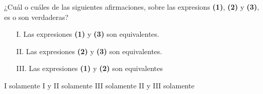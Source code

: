 \documentclass[10pt,letterpaper,addpoints]{exam}
\begin{document}
\begin{questions}
\begin{multicols}{2}
\begin{oneparchoices}
\end{oneparchoices}
  \question \label{q3} ¿Cuál o cuáles de las siguientes afirmaciones, sobre las expresions \textbf{(1)}, \textbf{(2)} y \textbf{(3)}, es o son verdaderas?
    \begin{itemize}
      \item[I.] Las expresiones \textbf{(1)} y \textbf{(3)} son equivalentes.
      \item[II.] Las expresiones \textbf{(2)} y \textbf{(3)} son equivalentes.
      \item[III.] Las expresiones \textbf{(1)} y \textbf{(2)} son equivalentes
      \end{itemize}
    \begin{choices}
      \choice I solamente
      \choice I y II solamente
      \CorrectChoice III solamente
      \choice II y III solamente    
    \end{choices}
\end{multicols}
\end{questions}
\end{document}
